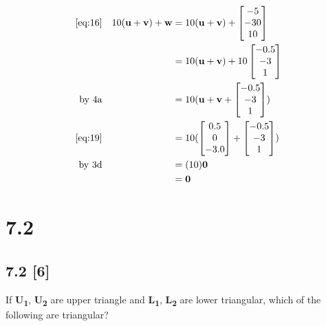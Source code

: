 \documentclass{article}
\begin{document}
\begin{align}
    \label{eq:28}
    \eqref{eq:16} && 10(\textbf{u} + \textbf{v}) + \textbf{w} &= 10(\textbf{u} + \textbf{v}) + \begin{bmatrix} -5\\ -30\\ 10 \end{bmatrix}
    \\
    \label{eq:29}
    && &= 10(\textbf{u} + \textbf{v}) + 10\begin{bmatrix}
    -0.5\\-3\\1
    \end{bmatrix}
    \\
    \label{eq:30}
    \text{by 4a} && &= 10(\textbf{u} + \textbf{v} + \begin{bmatrix}
    -0.5\\-3\\1
    \end{bmatrix})
    \\
    \label{eq:31}
    \eqref{eq:19} && &= 10(\begin{bmatrix}
    0.5\\0\\-3.0
    \end{bmatrix} + \begin{bmatrix}
    -0.5\\-3\\1
    \end{bmatrix})
    \\
    \label{eq:32}
    \text{by 3d} && &= (10)\textbf{0}
    \\
    \label{eq:33}
    && &= \textbf{0}
\end{align}

\newpage

\section*{7.2}
\setcounter{equation}{0}

\subsection*{7.2 [6]}
\setcounter{equation}{0}

\par If \textbf{U\textsubscript{1}}, \textbf{U\textsubscript{2}} are upper triangle and \textbf{L\textsubscript{1}}, \textbf{L\textsubscript{2}} are lower triangular, which of the following are triangular?

\def \Uonematrix {
\begin{bmatrix}
u & u & u\\
0 & u & u\\
0 & 0 & u
\end{bmatrix}
}
\def \Utwomatrix {
\begin{bmatrix}
v & v & v\\
0 & v & v\\
0 & 0 & v
\end{bmatrix}
}
\end{document}
